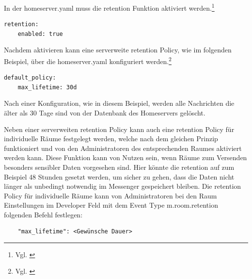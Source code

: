 In der homeserver.yaml muss die retention Funktion aktiviert werden.\footnote{Vgl. \cite{Matrix.org-retentio-policies2020}}

\begin{lstlisting}
retention:
    enabled: true
\end{lstlisting}

Nachdem aktivieren kann eine serverweite retention Policy, wie im folgenden Beispiel, über die homeserver.yaml konfiguriert werden.\footnote{Vgl. \cite{Matrix.org-retentio-policies2020}}

\begin{lstlisting}
default_policy:
    max_lifetime: 30d
\end{lstlisting}

Nach einer Konfiguration, wie in diesem Beispiel, werden alle Nachrichten die älter als 30 Tage sind von der Datenbank des Homeservers gelöscht.

Neben einer serverweiten retention Policy kann auch eine retention Policy für individuelle Räume festgelegt werden, welche nach dem gleichen Prinzip funktioniert und von den Administratoren des entsprechenden Raumes aktiviert werden kann. Diese Funktion kann von Nutzen sein, wenn Räume zum Versenden besonders sensibler Daten vorgesehen sind. Hier könnte die retention auf zum Beispiel 48 Stunden gesetzt werden, um sicher zu gehen, dass die Daten nicht länger als unbedingt notwendig im Messenger gespeichert bleiben. Die retention Policy für individuelle Räume kann von Administratoren bei den Raum Einstellungen im Developer Feld mit dem Event Type \glqq m.room.retention\grqq{} folgenden Befehl festlegen:

\begin{lstlisting}
    "max_lifetime": <Gewünsche Dauer>
\end{lstlisting}


